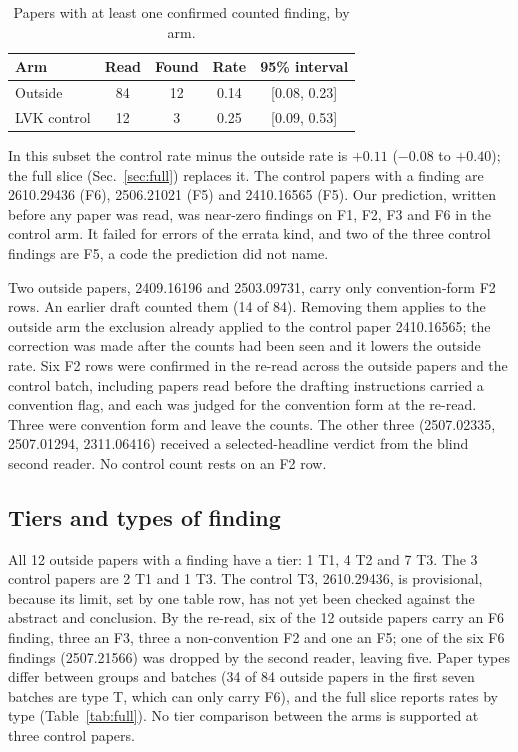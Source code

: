 \documentclass[reprint,amsmath,amssymb,aps,superscriptaddress,nofootinbib]{revtex4-2}
\begin{document}
\begin{table}[t]
\caption{Papers with at least one confirmed counted finding, by arm.}
\label{tab:rates}
\centering\small\setlength{\tabcolsep}{4pt}
\begin{tabular}{lcccc}
\hline\hline
Arm & Read & Found & Rate & 95\% interval \\ \hline
Outside & 84 & 12 & 0.14 & [0.08, 0.23] \\
LVK control & 12 & 3 & 0.25 & [0.09, 0.53] \\
\hline\hline
\end{tabular}
\end{table}

In this subset the control rate minus the outside rate is $+0.11$ ($-0.08$ to $+0.40$); the full slice (Sec.~\ref{sec:full}) replaces it. The control papers with a finding are 2610.29436 (F6), 2506.21021 (F5) and 2410.16565 (F5). Our prediction, written before any paper was read, was near-zero findings on F1, F2, F3 and F6 in the control arm. It failed for errors of the errata kind, and two of the three control findings are F5, a code the prediction did not name.

Two outside papers, 2409.16196 and 2503.09731, carry only convention-form F2 rows. An earlier draft counted them (14 of 84). Removing them applies to the outside arm the exclusion already applied to the control paper 2410.16565; the correction was made after the counts had been seen and it lowers the outside rate. Six F2 rows were confirmed in the re-read across the outside papers and the control batch, including papers read before the drafting instructions carried a convention flag, and each was judged for the convention form at the re-read. Three were convention form and leave the counts. The other three (2507.02335, 2507.01294, 2311.06416) received a selected-headline verdict from the blind second reader. No control count rests on an F2 row.

\subsection{Tiers and types of finding}

All 12 outside papers with a finding have a tier: 1 T1, 4 T2 and 7 T3. The 3 control papers are 2 T1 and 1 T3. The control T3, 2610.29436, is provisional, because its limit, set by one table row, has not yet been checked against the abstract and conclusion. By the re-read, six of the 12 outside papers carry an F6 finding, three an F3, three a non-convention F2 and one an F5; one of the six F6 findings (2507.21566) was dropped by the second reader, leaving five. Paper types differ between groups and batches (34 of 84 outside papers in the first seven batches are type T, which can only carry F6), and the full slice reports rates by type (Table~\ref{tab:full}). No tier comparison between the arms is supported at three control papers.
\end{document}
